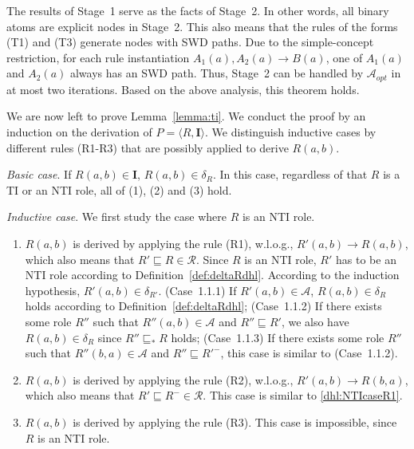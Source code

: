 \documentclass[final,1p,times]{elsarticle}
\begin{document}
The results of Stage~1 serve as the facts of Stage~2. In other words, all binary atoms
are explicit nodes in Stage~2. This also means that the rules of the forms (T1) and (T3)
generate nodes with SWD paths. Due to the simple-concept restriction, for each rule
instantiation $A_1(a),A_2(a)\rightarrow B(a)$, one of $A_1(a)$ and $A_2(a)$ always has an SWD path.
Thus, Stage~2 can be handled by $\mathcal{A}_{opt}$ in at most two iterations.
Based on the above analysis, this theorem holds.

We are now left to prove Lemma~\ref{lemma:ti}. We conduct the proof by an induction on
the derivation of $P=\langle R,\textbf{I}\rangle$. We distinguish inductive cases by different rules (R1-R3)
that are possibly applied to derive $R(a,b)$.

\emph{Basic case}. If $R(a,b)\in\textbf{I}$, $R(a,b)\in\delta_{R}$. In this case,
regardless of that $R$ is a TI or an NTI role, all of (1), (2) and (3) hold.

\emph{Inductive case}. We first study the case where $R$ is an NTI role.

\begin{enumerate}[leftmargin=12ex,label=Case~1.\arabic*, ref=Case~1.\arabic*]
\item $R(a,b)$ is derived by applying the rule (R1), w.l.o.g., $R'(a,b)\rightarrow R(a,b)$,
    which also means that $R'\sqsubseteq R\in\mathcal{R}$. Since $R$ is an NTI role, $R'$ has to
    be an NTI role according to Definition~\ref{def:deltaRdhl}. According to the induction hypothesis,
    $R'(a,b)\in\delta_{R'}$. (Case~1.1.1) If $R'(a,b)\in\mathcal{A}$, $R(a,b)\in\delta_{R}$
    holds according to Definition~\ref{def:deltaRdhl}; (Case~1.1.2) If there exists some
    role $R''$ such that $R''(a,b)\in\mathcal{A}$ and $R''\sqsubseteq R'$, we also have
    $R(a,b)\in\delta_{R}$ since $R''\sqsubseteq_* R$ holds; (Case~1.1.3) If there exists some
    role $R''$ such that $R''(b,a)\in\mathcal{A}$ and $R''\sqsubseteq R'^-$, this case is
    similar to (Case~1.1.2).\label{dhl:NTIcaseR1}

\item $R(a,b)$ is derived by applying the rule (R2), w.l.o.g., $R'(a,b)\rightarrow R(b,a)$,
    which also means that $R'\sqsubseteq R^-\in\mathcal{R}$. This case is similar
    to \ref{dhl:NTIcaseR1}.\label{dhl:NTIcaseR2}

\item $R(a,b)$ is derived by applying the rule (R3). This case is impossible, since $R$ is
    an NTI role.
\end{enumerate}
\end{document}
